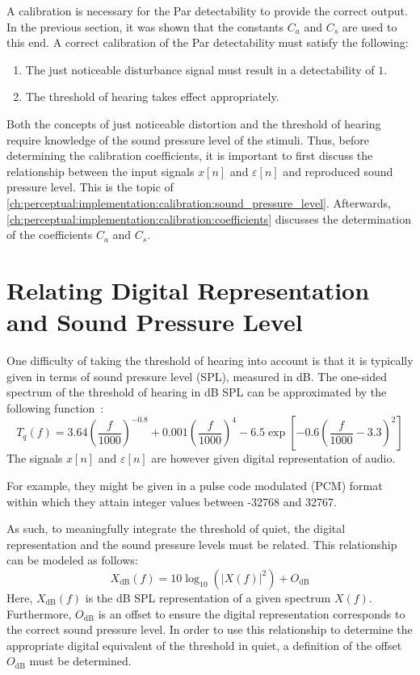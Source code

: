 A calibration is necessary for the Par detectability to provide the correct output.
In the previous section, it was shown that the constants $C_a$ and $C_s$ are used to this end.
A correct calibration of the Par detectability must satisfy the following:
\begin{enumerate}
    \item The just noticeable disturbance signal must result in a detectability of $1$.
    \item The threshold of hearing takes effect appropriately.
\end{enumerate}
Both the concepts of just noticeable distortion and the threshold of hearing require knowledge of the 
sound pressure level of the stimuli.
Thus, before determining the calibration coefficients, it is important to first discuss the 
relationship between the input signals $x[n]$ and $\varepsilon[n]$ and reproduced sound pressure level.
This is the topic of \autoref{ch:perceptual:implementation:calibration:sound_pressure_level}.
Afterwards, \autoref{ch:perceptual:implementation:calibration:coefficients} discusses the determination of 
the coefficients $C_a$ and $C_s$. 

\section{Relating Digital Representation and Sound Pressure Level}
\label{ch:perceptual:implementation:calibration:sound_pressure_level}
One difficulty of taking the threshold of hearing into account is that it is typically given in terms of sound pressure level (SPL), measured in dB. 
The one-sided spectrum of the threshold of hearing in dB SPL can be approximated by the following function~\cite{painter2000perceptual}:
\begin{equation}
    T_q(f) = 3.64\left(\frac{f}{1000}\right)^{-0.8} + 0.001\left(\frac{f}{1000}\right)^4 - 6.5\exp\left[-0.6\left(\frac{f}{1000}-3.3\right)^2\right]
\end{equation}
The signals $x[n]$ and $\varepsilon[n]$ are however given digital representation of audio. 

For example, they might be given in a pulse code modulated (PCM) format within which they attain integer values between -32768 and 32767.

As such, to meaningfully integrate the threshold of quiet, the digital representation and the sound pressure levels must be related.
This relationship can be modeled as follows:
\begin{equation}
    X_\text{dB}(f) = 10\log_{10}(\left|X(f)\right|^2) + O_\text{dB}
    \label{eq:perceptual:implementation:calibration:sound_pressure_level:dB_representation}
\end{equation}
Here, $X_\text{dB}(f)$ is the dB SPL representation of a given spectrum $X(f)$.
Furthermore, $O_\text{dB}$ is an offset to ensure the digital representation corresponds to the correct sound pressure level. 
In order to use this relationship to determine the appropriate digital equivalent of the threshold in quiet, a definition of the offset $O_\text{dB}$
must be determined.

